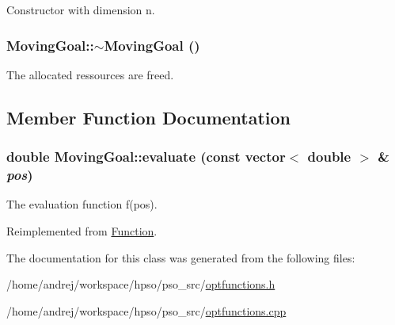 Constructor with dimension n. 

\hypertarget{classMovingGoal_482ed4706f4651bb1768ad29a6be0dc9}{
\subsubsection{\setlength{\rightskip}{0pt plus 5cm}MovingGoal::$\sim$MovingGoal ()}}
\label{classMovingGoal_482ed4706f4651bb1768ad29a6be0dc9}


The allocated ressources are freed. 



\subsection{Member Function Documentation}
\hypertarget{classMovingGoal_495b2d42c272fb2a941792e67c8c79c4}{
\subsubsection{\setlength{\rightskip}{0pt plus 5cm}double MovingGoal::evaluate (const vector$<$ double $>$ \& {\em pos})}}
\label{classMovingGoal_495b2d42c272fb2a941792e67c8c79c4}


The evaluation function f(pos). 



Reimplemented from \hyperlink{classFunction_159260a1fc3afa8932491e4057b6b844}{Function}.

The documentation for this class was generated from the following files:\begin{CompactItemize}
\item 
/home/andrej/workspace/hpso/pso\_\-src/\hyperlink{optfunctions_8h}{optfunctions.h}\item 
/home/andrej/workspace/hpso/pso\_\-src/\hyperlink{optfunctions_8cpp}{optfunctions.cpp}\end{CompactItemize}
